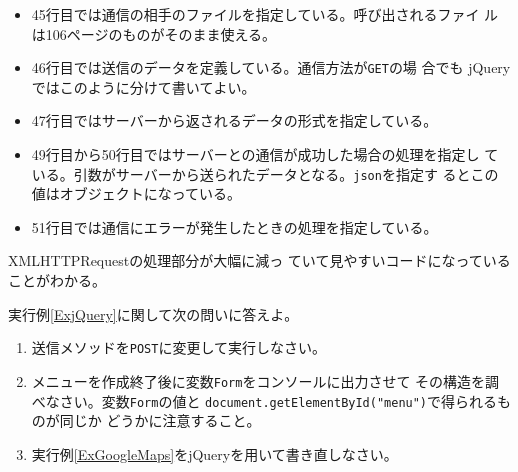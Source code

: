 \begin{Exec}
\begin{itemize}
\begin{itemize}
\begin{itemize}
 \item 45行目では通信の相手のファイルを指定している。呼び出されるファイ
       ルは106ページのものがそのまま使える。
 \item 46行目では送信のデータを定義している。通信方法が\texttt{GET}の場
       合でも jQuery ではこのように分けて書いてよい。
 \item 47行目ではサーバーから返されるデータの形式を指定している。
 \item 49行目から50行目ではサーバーとの通信が成功した場合の処理を指定し
       ている。引数がサーバーから送られたデータとなる。\texttt{json}を指定す
       るとこの値はオブジェクトになっている。
 \item 51行目では通信にエラーが発生したときの処理を指定している。
\end{itemize}
         XMLHTTPRequestの処理部分が大幅に減っ
	       ていて見やすいコードになっていることがわかる。
	\end{itemize}
 \end{itemize}
 \end{Exec}
 \begin{Prob}\upshape
  実行例\ref{ExjQuery}に関して次の問いに答えよ。
\begin{enumerate}
   \item 送信メソッドを\texttt{POST}に変更して実行しなさい。
   \item メニューを作成終了後に変数\texttt{Form}をコンソールに出力させて
         その構造を調べなさい。変数\texttt{Form}の値と
         \texttt{document.getElementById("menu")}で得られるものが同じか
         どうかに注意すること。
   \item   実行例\ref{ExGoogleMaps}をjQueryを用いて書き直しなさい。
\end{enumerate}
 \end{Prob}
